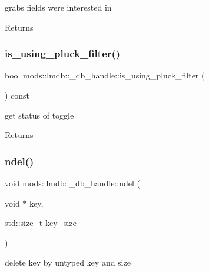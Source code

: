 grabs fields we\textquotesingle{}re interested in 

\begin{DoxyReturn}{Returns}

\end{DoxyReturn}
\mbox{\label{structmods_1_1lmdb_1_1__db__handle_ae6943acbfe888c2e2d0cd58ac2d8ec3d}} 
\subsubsection{\texorpdfstring{is\+\_\+using\+\_\+pluck\+\_\+filter()}{is\_using\_pluck\_filter()}}
{\footnotesize\ttfamily bool mods\+::lmdb\+::\+\_\+db\+\_\+handle\+::is\+\_\+using\+\_\+pluck\+\_\+filter (\begin{DoxyParamCaption}{ }\end{DoxyParamCaption}) const}



get status of toggle 

\begin{DoxyReturn}{Returns}

\end{DoxyReturn}
\mbox{\label{structmods_1_1lmdb_1_1__db__handle_afed682f1c1b4481e3d94785a96c361bb}} 
\subsubsection{\texorpdfstring{ndel()}{ndel()}}
{\footnotesize\ttfamily void mods\+::lmdb\+::\+\_\+db\+\_\+handle\+::ndel (\begin{DoxyParamCaption}\item[{void $\ast$}]{key,  }\item[{std\+::size\+\_\+t}]{key\+\_\+size }\end{DoxyParamCaption})}



delete key by untyped key and size 



